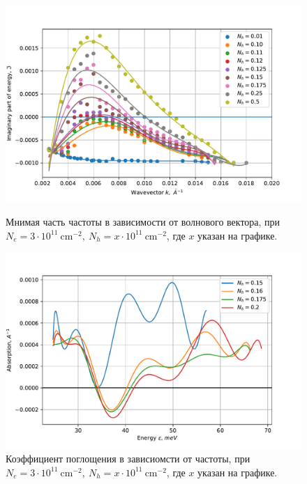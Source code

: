 \documentclass[../main.tex]{subfiles}
\begin{document}
    \begin{figure}[h]
        \begin{minipage}[h]{1\textwidth}
            \includegraphics[width=1\textwidth]{./images/plazmon6nm3neXnpim.pdf}
            \caption{Мнимая часть частоты в зависимости от волнового вектора, при 
            $N_e = 3 \cdot 10^{11}~\text{cm}^{-2},~N_h = x \cdot 10^{11}~\text{cm}^{-2}$,
            где $x$ указан на графике.\label{plasmon:6nm3neXnpim}}
        \end{minipage}
        \begin{minipage}[h]{1\textwidth}
            \includegraphics[width=1\textwidth]{./images/absortion-6nm-ne2.pdf}
            \caption{Коэффициент поглощения в зависиомсти от частоты, при 
            $N_e = 3 \cdot 10^{11}~\text{cm}^{-2},~N_h = x \cdot 10^{11}~\text{cm}^{-2}$,
            где $x$ указан на графике.\label{plasmon:6nm3neXnpAbs}}
        \end{minipage}
    \end{figure}
\end{document}
